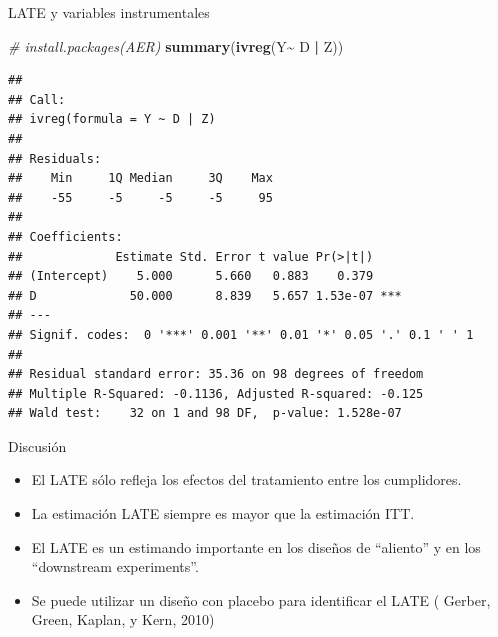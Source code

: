 \documentclass[
  ignorenonframetext,
]{beamer}
\newenvironment{Shaded}{\begin{snugshade}}{\end{snugshade}}
\newcommand{\CommentTok}[1]{\textcolor[rgb]{0.56,0.35,0.01}{\textit{#1}}}
\newcommand{\KeywordTok}[1]{\textcolor[rgb]{0.13,0.29,0.53}{\textbf{#1}}}
\newcommand{\NormalTok}[1]{#1}
\newcommand{\OperatorTok}[1]{\textcolor[rgb]{0.81,0.36,0.00}{\textbf{#1}}}
\newcommand{\StringTok}[1]{\textcolor[rgb]{0.31,0.60,0.02}{#1}}
\providecommand{\tightlist}{%
  \setlength{\itemsep}{0pt}\setlength{\parskip}{0pt}}
\begin{document}
\begin{frame}[fragile]{LATE y variables instrumentales}
\protect\hypertarget{late-y-variables-instrumentales-2}{}
\tiny

\begin{Shaded}
\begin{Highlighting}[]
\CommentTok{\# install.packages(AER)}
\KeywordTok{summary}\NormalTok{(}\KeywordTok{ivreg}\NormalTok{(Y}\OperatorTok{\textasciitilde{}}\StringTok{ }\NormalTok{D }\OperatorTok{|}\StringTok{ }\NormalTok{Z)) }
\end{Highlighting}
\end{Shaded}

\begin{verbatim}
## 
## Call:
## ivreg(formula = Y ~ D | Z)
## 
## Residuals:
##    Min     1Q Median     3Q    Max 
##    -55     -5     -5     -5     95 
## 
## Coefficients:
##             Estimate Std. Error t value Pr(>|t|)    
## (Intercept)    5.000      5.660   0.883    0.379    
## D             50.000      8.839   5.657 1.53e-07 ***
## ---
## Signif. codes:  0 '***' 0.001 '**' 0.01 '*' 0.05 '.' 0.1 ' ' 1
## 
## Residual standard error: 35.36 on 98 degrees of freedom
## Multiple R-Squared: -0.1136, Adjusted R-squared: -0.125 
## Wald test:    32 on 1 and 98 DF,  p-value: 1.528e-07
\end{verbatim}
\end{frame}

\begin{frame}{Discusión}
\protect\hypertarget{discusiuxf3n}{}
\begin{itemize}
\tightlist
\item
  El LATE sólo refleja los efectos del tratamiento entre los
  cumplidores. \pause
\item
  La estimación LATE siempre es mayor que la estimación ITT. \pause
\item
  El LATE es un estimando importante en los diseños de ``aliento'' y en
  los ``downstream experiments''. \pause
\item
  Se puede utilizar un diseño con placebo para identificar el LATE (
  Gerber, Green, Kaplan, y Kern, 2010)
\end{itemize}
\end{frame}
\end{document}
